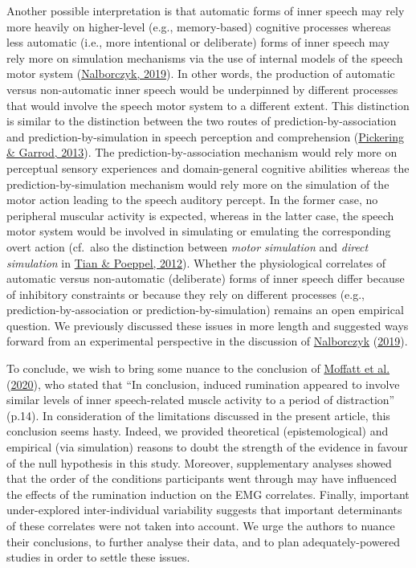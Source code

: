 \documentclass[
  english,
  man, donotrepeattitle,floatsintext]{apa6}
\begin{document}
Another possible interpretation is that automatic forms of inner speech may rely more heavily on higher-level (e.g., memory-based) cognitive processes whereas less automatic (i.e., more intentional or deliberate) forms of inner speech may rely more on simulation mechanisms via the use of internal models of the speech motor system (\protect\hyperlink{ref-nalborczyk_understanding_2019}{Nalborczyk, 2019}). In other words, the production of automatic versus non-automatic inner speech would be underpinned by different processes that would involve the speech motor system to a different extent. This distinction is similar to the distinction between the two routes of prediction-by-association and prediction-by-simulation in speech perception and comprehension (\protect\hyperlink{ref-pickering_integrated_2013}{Pickering \& Garrod, 2013}). The prediction-by-association mechanism would rely more on perceptual sensory experiences and domain-general cognitive abilities whereas the prediction-by-simulation mechanism would rely more on the simulation of the motor action leading to the speech auditory percept. In the former case, no peripheral muscular activity is expected, whereas in the latter case, the speech motor system would be involved in simulating or emulating the corresponding overt action (cf.~also the distinction between \emph{motor simulation} and \emph{direct simulation} in \protect\hyperlink{ref-tian_mental_2012}{Tian \& Poeppel, 2012}). Whether the physiological correlates of automatic versus non-automatic (deliberate) forms of inner speech differ because of inhibitory constraints or because they rely on different processes (e.g., prediction-by-association or prediction-by-simulation) remains an open empirical question. We previously discussed these issues in more length and suggested ways forward from an experimental perspective in the discussion of \protect\hyperlink{ref-nalborczyk_understanding_2019}{Nalborczyk} (\protect\hyperlink{ref-nalborczyk_understanding_2019}{2019}).

To conclude, we wish to bring some nuance to the conclusion of \protect\hyperlink{ref-moffatt_inner_2020}{Moffatt et al.} (\protect\hyperlink{ref-moffatt_inner_2020}{2020}), who stated that ``In conclusion, induced rumination appeared to involve similar levels of inner speech-related muscle activity to a period of distraction'' (p.14). In consideration of the limitations discussed in the present article, this conclusion seems hasty. Indeed, we provided theoretical (epistemological) and empirical (via simulation) reasons to doubt the strength of the evidence in favour of the null hypothesis in this study. Moreover, supplementary analyses showed that the order of the conditions participants went through may have influenced the effects of the rumination induction on the EMG correlates. Finally, important under-explored inter-individual variability suggests that important determinants of these correlates were not taken into account. We urge the authors to nuance their conclusions, to further analyse their data, and to plan adequately-powered studies in order to settle these issues.
\end{document}
